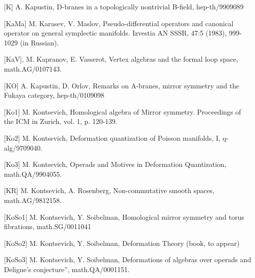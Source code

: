 \documentclass[a4paper,12pt]{article}
\begin{document}
\vspace{2mm}

[K]  A. Kapustin, D-branes in a topologically nontrivial B-field,
  hep-th/9909089 

\vspace{2mm}

[KaMa] M. Karasev, V. Maslov, Pseudo-differential operators and canonical operator
on general symplectic manifolds. Izvestia AN SSSR, 47:5 (1983), 999-1029 (in Russian).

\vspace{2mm}

[KaV], M. Kapranov, E. Vasserot, Vertex algebras and the formal loop space,
 math.AG/0107143.
 
 \vspace{2mm}

[KO] A. Kapustin, D. Orlov, Remarks on A-branes, mirror symmetry and
the Fukaya category, hep-th/0109098

\vspace{2mm}

[Ko1] M. Kontsevich, Homological algebra of Mirror symmetry. Proceedings
of the ICM in Zurich, vol. 1, p. 120-139.

\vspace{2mm}

[Ko2] M. Kontsevich, Deformation quantization of Poisson manifolds, I, 
q-alg/9709040. 


\vspace{2mm}

[Ko3] M. Kontsevich, Operads and Motives in Deformation Quantization,
 math.QA/9904055.
 
 \vspace{2mm}

[KR] M. Kontsevich, A. Rosenberg, Non-commutative smooth spaces, 
math.AG/9812158.

\vspace{2mm}


[KoSo1]  M. Kontsevich, Y. Soibelman,  
Homological mirror symmetry and torus fibrations,
math.SG/0011041

\vspace{2mm}

[KoSo2]  M. Kontsevich, Y. Soibelman, Deformation Theory (book, to appear) 

\vspace{2mm}

[KoSo3]  M. Kontsevich, Y. Soibelman, Deformations of algebras over
operads and Deligne's conjecture'', math.QA/0001151.
\end{document}
